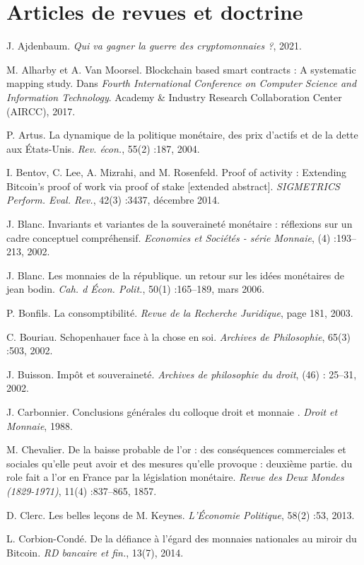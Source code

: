 {\section*{Articles de revues et doctrine}
J. Ajdenbaum. \emph{Qui va gagner la guerre des cryptomonnaies ?}, 2021.\par
M. Alharby et A. Van Moorsel. Blockchain based smart contracts : A systematic mapping study. Dans \emph{Fourth International Conference on Computer Science and Information Technology}. Academy \& Industry Research Collaboration Center (AIRCC), 2017.\par
P. Artus. La dynamique de la politique monétaire, des prix d'actifs et de la dette aux États-Unis. \emph{Rev. écon.}, 55(2) :187, 2004.\par
I. Bentov, C. Lee, A. Mizrahi, and M. Rosenfeld. Proof of activity : Extending Bitcoin's proof of work via proof of stake [extended abstract]. \emph{SIGMETRICS Perform. Eval. Rev.}, 42(3) :3437, décembre 2014.\par
J. Blanc. Invariants et variantes de la souveraineté monétaire : réflexions sur un cadre conceptuel compréhensif. \emph{Economies et Sociétés - série Monnaie}, (4) :193–213, 2002.\par
J. Blanc. Les monnaies de la république. un retour sur les idées monétaires de jean bodin. \emph{Cah. d Écon. Polit.}, 50(1) :165–189, mars 2006.\par
P. Bonfils. La consomptibilité. \emph{Revue de la Recherche Juridique}, page 181, 2003.\par
C. Bouriau. Schopenhauer face à la chose en soi. \emph{Archives de Philosophie}, 65(3) :503, 2002.\par
J. Buisson. Impôt et souveraineté. \emph{Archives de philosophie du droit}, (46) : 25–31, 2002.\par
J. Carbonnier. Conclusions générales du colloque \og droit et monnaie \fg{}. \emph{Droit et Monnaie}, 1988.\par
M. Chevalier. De la baisse probable de l'or : des conséquences commerciales et sociales qu'elle peut avoir et des mesures qu'elle provoque : deuxième partie. du role fait a l'or en France par la législation monétaire. \emph{Revue des Deux Mondes (1829-1971)}, 11(4) :837–865, 1857.\par
D. Clerc. Les belles leçons de M. Keynes. \emph{L'Économie Politique}, 58(2) :53, 2013.\par
L. Corbion-Condé. De la défiance à l'égard des monnaies nationales au miroir du Bitcoin. \emph{RD bancaire et fin.}, 13(7), 2014.\par
}
